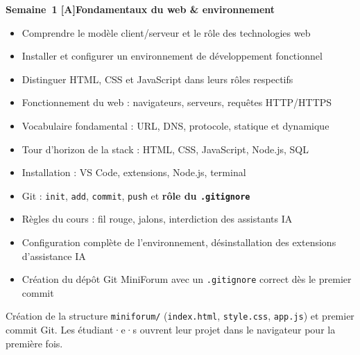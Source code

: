 \documentclass[a4paper,11pt]{article}
\newcommand{\semainetitre}[4]{%
  \needspace{9\baselineskip}%
  \vspace{8pt}
  \noindent
  \begin{tcolorbox}[
    enhanced, colback=cfptBlack, colframe=cfptBlack,
    boxrule=0pt, arc=3pt, boxsep=0pt,
    left=8pt, right=90pt, top=4pt, bottom=4pt,
    overlay={%
      \node[anchor=east, fill=cfptYellow, text=cfptBlack,
            rounded corners=2pt, inner xsep=6pt, inner ysep=3pt,
            font=\scriptsize\bfseries]
        at ([xshift=-6pt]frame.east) {#3};}
  ]
  \color{white}\bfseries\small Semaine~#1 \quad\textcolor{cfptYellow}{[#4]}\quad #2
  \end{tcolorbox}
  \vspace{-4pt}
}
\newcommand{\contenutitre}[1]{%
  \vspace{4pt}
  \noindent{\small\color{accentBlue}\textbf{#1}}\vspace{2pt}
}
\begin{document}
\semainetitre{1}{Fondamentaux du web \& environnement}{3h cours / 4h TP}{A}
\begin{tcolorbox}[semaine]
\begin{tcolorbox}[objectifs]
\begin{itemize}
  \item Comprendre le modèle client/serveur et le rôle des technologies web
  \item Installer et configurer un environnement de développement fonctionnel
  \item Distinguer HTML, CSS et JavaScript dans leurs rôles respectifs
\end{itemize}
\end{tcolorbox}
\vspace{4pt}
\contenutitre{Cours}
\begin{itemize}
  \item Fonctionnement du web : navigateurs, serveurs, requêtes HTTP/HTTPS
  \item Vocabulaire fondamental : URL, DNS, protocole, statique et dynamique
  \item Tour d'horizon de la stack : HTML, CSS, JavaScript, Node.js, SQL
  \item Installation : VS Code, extensions, Node.js, terminal
  \item Git : \texttt{init}, \texttt{add}, \texttt{commit}, \texttt{push} et \textbf{rôle du \texttt{.gitignore}}
  \item Règles du cours : fil rouge, jalons, interdiction des assistants IA
\end{itemize}
\contenutitre{Travaux pratiques}
\begin{itemize}
  \item Configuration complète de l'environnement, désinstallation des extensions d'assistance IA
  \item Création du dépôt Git MiniForum avec un \texttt{.gitignore} correct dès le premier commit
\end{itemize}
\end{tcolorbox}
\begin{tcolorbox}[filrouge={Mise en place du projet}]
\small Création de la structure \texttt{miniforum/} (\texttt{index.html}, \texttt{style.css}, \texttt{app.js}) et premier commit Git. Les étudiant·e·s ouvrent leur projet dans le navigateur pour la première fois.
\end{tcolorbox}
\end{document}
